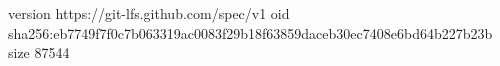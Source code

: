 version https://git-lfs.github.com/spec/v1
oid sha256:eb7749f7f0c7b063319ac0083f29b18f63859daceb30ec7408e6bd64b227b23b
size 87544
